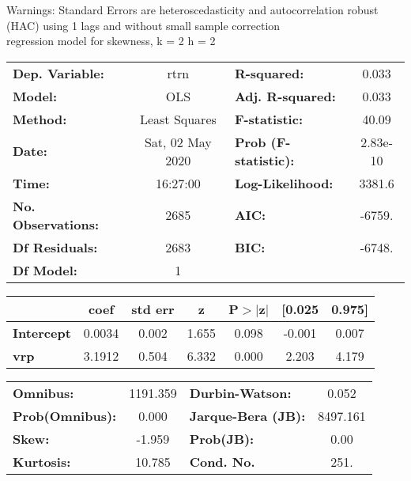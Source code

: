 Warnings: \newline
 [1] Standard Errors are heteroscedasticity and autocorrelation robust (HAC) using 1 lags and without small sample correction\\ 

regression model for skewness, k = 2 h = 2\begin{center}
\begin{tabular}{lclc}
\toprule
\textbf{Dep. Variable:}    &       rtrn       & \textbf{  R-squared:         } &     0.033   \\
\textbf{Model:}            &       OLS        & \textbf{  Adj. R-squared:    } &     0.033   \\
\textbf{Method:}           &  Least Squares   & \textbf{  F-statistic:       } &     40.09   \\
\textbf{Date:}             & Sat, 02 May 2020 & \textbf{  Prob (F-statistic):} &  2.83e-10   \\
\textbf{Time:}             &     16:27:00     & \textbf{  Log-Likelihood:    } &    3381.6   \\
\textbf{No. Observations:} &        2685      & \textbf{  AIC:               } &    -6759.   \\
\textbf{Df Residuals:}     &        2683      & \textbf{  BIC:               } &    -6748.   \\
\textbf{Df Model:}         &           1      & \textbf{                     } &             \\
\bottomrule
\end{tabular}
\begin{tabular}{lcccccc}
                   & \textbf{coef} & \textbf{std err} & \textbf{z} & \textbf{P$> |$z$|$} & \textbf{[0.025} & \textbf{0.975]}  \\
\midrule
\textbf{Intercept} &       0.0034  &        0.002     &     1.655  &         0.098        &       -0.001    &        0.007     \\
\textbf{vrp}       &       3.1912  &        0.504     &     6.332  &         0.000        &        2.203    &        4.179     \\
\bottomrule
\end{tabular}
\begin{tabular}{lclc}
\textbf{Omnibus:}       & 1191.359 & \textbf{  Durbin-Watson:     } &    0.052  \\
\textbf{Prob(Omnibus):} &   0.000  & \textbf{  Jarque-Bera (JB):  } & 8497.161  \\
\textbf{Skew:}          &  -1.959  & \textbf{  Prob(JB):          } &     0.00  \\
\textbf{Kurtosis:}      &  10.785  & \textbf{  Cond. No.          } &     251.  \\
\bottomrule
\end{tabular}
\end{center}

